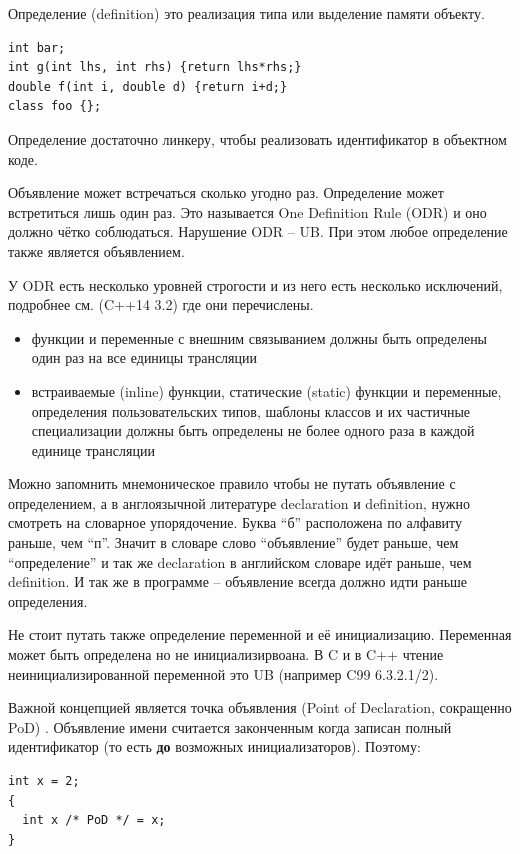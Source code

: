 \documentclass[a4paper,12pt,oneside]{article}
\begin{document}
Определение (definition) это реализация типа или выделение памяти объекту.

\begin{lstlisting}
int bar;
int g(int lhs, int rhs) {return lhs*rhs;}
double f(int i, double d) {return i+d;}
class foo {};
\end{lstlisting}

Определение достаточно линкеру, чтобы реализовать идентификатор в объектном коде. 

Объявление может встречаться сколько угодно раз. Определение может встретиться лишь один раз. Это называется One Definition Rule (ODR) и оно должно чётко соблюдаться. Нарушение ODR -- UB. При этом любое определение также является объявлением.

У ODR есть несколько уровней строгости и из него есть несколько исключений, подробнее см. (C++14 3.2) где они перечислены.

\begin{itemize}
\item функции и переменные с внешним связыванием должны быть определены один раз на все единицы трансляции
\item встраиваемые (inline) функции, статические (static) функции и переменные, определения пользовательских типов, шаблоны классов и их частичные специализации должны быть определены не более одного раза в каждой единице трансляции
\end{itemize}

Можно запомнить мнемоническое правило чтобы не путать объявление с определением, а в англоязычной литературе declaration и definition, нужно смотреть на словарное упорядочение.  Буква ``б'' расположена по алфавиту раньше, чем ``п''. Значит в словаре слово ``объявление'' будет раньше, чем ``определение'' и так же declaration в английском словаре идёт раньше, чем definition. И так же в программе – объявление всегда должно идти раньше определения.

Не стоит путать также определение переменной и её инициализацию. Переменная может быть определена но не инициализирвоана. В C и в C++ чтение неинициализированной переменной это UB (например C99 6.3.2.1/2).

Важной концепцией является точка объявления (Point of Declaration, сокращенно PoD) . Объявление имени считается законченным когда записан полный идентификатор (то есть \textbf{до} возможных инициализаторов). Поэтому:

\begin{lstlisting}
int x = 2;
{
  int x /* PoD */ = x;
}
\end{lstlisting}
\end{document}
